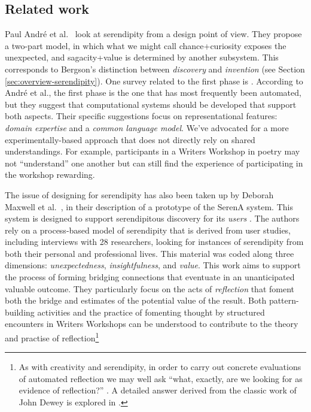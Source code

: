 \subsection{Related work} \label{sec:related}

Paul Andr{\'e} et al.~\citeyear{andre2009discovery} look at serendipity
from a design point of view.  They propose a two-part model, in which
what we might call chance+curiosity exposes the unexpected, and
sagacity+value is determined by another subsystem.  This corresponds
to Bergson's distinction between \emph{discovery} and \emph{invention}
(see Section \ref{sec:overview-serendipity}).  One survey related to
the first phase is \cite{foster2003serendipity}.  According to Andr\'e
et al., the first phase is the one that has most frequently been
automated, but they suggest that computational systems should be
developed that support both aspects.  Their specific suggestions focus
on representational features: \emph{domain expertise} and a
\emph{common language model}.  We've advocated for a more
experimentally-based approach that does not directly rely on shared
understandings.  For example, participants in a Writers Workshop in
poetry may not ``understand'' one another but can still find the
experience of participating in the workshop rewarding.

The issue of designing for serendipity has also been taken up by
Deborah Maxwell et al.~\cite{maxwell2012designing}, in their
description of a prototype of the {\sf SerenA} system.  This system is
designed to support serendipitous discovery for its \emph{users}
\cite{forth2013serena}.  The authors rely on a process-based model of
serendipity \cite{Makri2012,Makri2012a} that is derived from user
studies, including interviews with 28 researchers, looking for
instances of serendipity from both their personal and professional
lives.  This material was coded along three dimensions:
\emph{unexpectedness}, \emph{insightfulness}, and \emph{value}.  This
work aims to support the process of forming bridging connections that
eventuate in an unanticipated valuable outcome.  They particularly
focus on the acts of \emph{reflection} that foment both the bridge and
estimates of the potential value of the result.  Both pattern-building
activities and the practice of fomenting thought by structured
encounters in Writers Workshops can be understood to contribute to the
theory and practise of reflection\footnote{As with creativity and
  serendipity, in order to carry out concrete evaluations of automated
  reflection we may well ask ``what, exactly, are we looking for as
  evidence of reflection?'' \cite{rodgers2002defining}.  A detailed
  answer derived from the classic work of John Dewey
  \citeyear{dewey1997we} is explored in \cite{rodgers2002defining}.}

